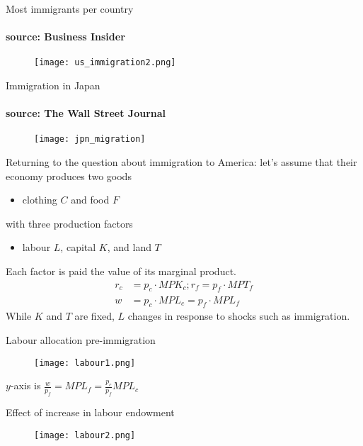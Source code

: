 \documentclass{beamer}
\begin{document}
\begin{frame}{Most immigrants per country}\framesubtitle{source: Business Insider}
 \begin{figure}
   \texttt{[image: us\_immigration2.png]} 
 \end{figure}
\end{frame}

\begin{frame}{Immigration in Japan}
\framesubtitle{source: The Wall Street Journal}
  \begin{figure}
    \texttt{[image: jpn\_migration]}
  \end{figure}  
\end{frame}

\begin{frame}
Returning to the question about immigration to America: let's assume that their economy produces two goods
  \begin{itemize}
    \item clothing $C$ and food $F$
  \end{itemize}
  \medskip 
with three production factors
\begin{itemize}
  \item labour $L$, capital $K$, and land $T$  
\end{itemize}
\medskip
Each factor is paid the value of its marginal product.
 \begin{align*}
  r_c&=p_c\cdot MPK_c; r_f=p_f\cdot MPT_f\\
  w&=p_c\cdot MPL_c=p_f\cdot MPL_f
 \end{align*}
\medskip
While $K$ and $T$ are fixed, $L$ changes in response to shocks such as immigration.
\end{frame}

\begin{frame}{Labour allocation pre-immigration}
  \begin{figure}
    \texttt{[image: labour1.png]}
  \end{figure}
  $y$-axis is $\frac{w}{p_f} = MPL_f = \frac{p_c}{p_f}MPL_c$
\end{frame}

\begin{frame}{Effect of increase in labour endowment}
  \begin{figure}
    \texttt{[image: labour2.png]}
  \end{figure}
\end{frame}
\end{document}
